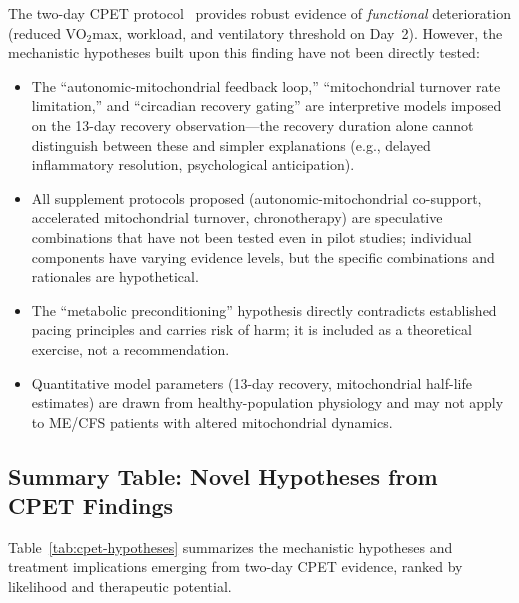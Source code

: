 \begin{limitation}
The two-day CPET protocol~\cite{keller2024cpet} provides robust evidence of \emph{functional} deterioration (reduced VO$_2$max, workload, and ventilatory threshold on Day~2). However, the mechanistic hypotheses built upon this finding have not been directly tested:
\begin{itemize}
    \item The ``autonomic-mitochondrial feedback loop,'' ``mitochondrial turnover rate limitation,'' and ``circadian recovery gating'' are interpretive models imposed on the 13-day recovery observation---the recovery duration alone cannot distinguish between these and simpler explanations (e.g., delayed inflammatory resolution, psychological anticipation).
    \item All supplement protocols proposed (autonomic-mitochondrial co-support, accelerated mitochondrial turnover, chronotherapy) are speculative combinations that have not been tested even in pilot studies; individual components have varying evidence levels, but the specific combinations and rationales are hypothetical.
    \item The ``metabolic preconditioning'' hypothesis directly contradicts established pacing principles and carries risk of harm; it is included as a theoretical exercise, not a recommendation.
    \item Quantitative model parameters (13-day recovery, mitochondrial half-life estimates) are drawn from healthy-population physiology and may not apply to ME/CFS patients with altered mitochondrial dynamics.
\end{itemize}
\end{limitation}

\subsection{Summary Table: Novel Hypotheses from CPET Findings}

Table~\ref{tab:cpet-hypotheses} summarizes the mechanistic hypotheses and treatment implications emerging from two-day CPET evidence, ranked by likelihood and therapeutic potential.

